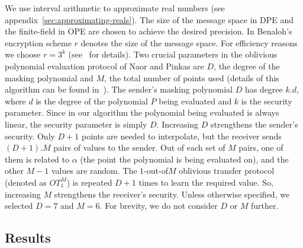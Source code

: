 We use interval arithmetic to approximate real numbers (see
appendix~\ref{sec:approximating-reals}).  The size of the message space in
DPE and the finite-field in OPE are chosen to achieve the desired
precision. In Benaloh's encryption scheme $r$ denotes the size of the
message space. For efficiency reasons we choose $r=3^k$
(see~\cite{Benaloh:94} for details). Two crucial parameters in the
oblivious polynomial evaluation protocol of Naor and Pinkas are $D$,
the degree of the masking polynomial and $M$, the total number of
points used (details of this algorithm can be found
in~\cite{NaorPinkas99}). The sender's masking polynomial $D$ has
degree $k .  d$, where $d$ is the degree of the polynomial $P$
being evaluated and $k$ is the security parameter.  Since in our
algorithm the polynomial being evaluated is always linear, the
security parameter is simply $D$.  Increasing $D$ strengthens the
sender's security.  Only $D+1$ points are needed to interpolate, but
the receiver sends $(D+1) . M$ pairs of values to the sender.  Out
of each set of $M$ pairs, one of them is related to $\alpha$ (the
point the polynomial is being evaluated on), and the other $M-1$
values are random.  The $1$-out-of$M$ oblivious transfer protocol
(denoted as $OT_1^M$) is repeated $D+1$ times to learn the required
value.  So, increasing $M$ strengthens the receiver's security.
Unless otherwise specified, we selected $D=7$ and $M=6$.  For brevity,
we do not consider $D$ or $M$ further.

\subsection{Results}
\label{sec:exres}

